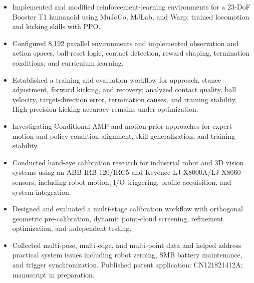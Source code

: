 \documentclass[10pt]{article}
\begin{document}
\begin{itemize}
  \item Implemented and modified reinforcement-learning environments for a 23-DoF Booster T1 humanoid using MuJoCo, MJLab, and Warp; trained locomotion and kicking skills with PPO.
  \item Configured 8,192 parallel environments and implemented observation and action spaces, ball-reset logic, contact detection, reward shaping, termination conditions, and curriculum learning.
  \item Established a training and evaluation workflow for approach, stance adjustment, forward kicking, and recovery; analyzed contact quality, ball velocity, target-direction error, termination causes, and training stability. High-precision kicking accuracy remains under optimization.
  \item Investigating Conditional AMP and motion-prior approaches for expert-motion and policy-condition alignment, skill generalization, and training stability.
\end{itemize}

\begin{itemize}
  \item Conducted hand-eye calibration research for industrial robot and 3D vision systems using an ABB IRB-120/IRC5 and Keyence LJ-X8000A/LJ-X8060 sensors, including robot motion, I/O triggering, profile acquisition, and system integration.
  \item Designed and evaluated a multi-stage calibration workflow with orthogonal geometric pre-calibration, dynamic point-cloud screening, refinement optimization, and independent testing.
  \item Collected multi-pose, multi-edge, and multi-point data and helped address practical system issues including robot zeroing, SMB battery maintenance, and trigger synchronization. Published patent application: CN121821412A; manuscript in preparation.
\end{itemize}
\end{document}
